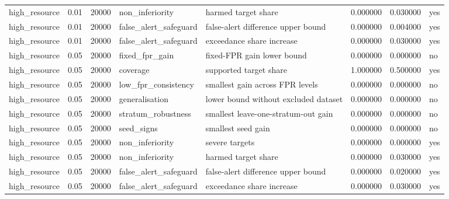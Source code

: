 \begin{tabular}{llllllll}
high\_resource & 0.01 & 20000 & non\_inferiority & harmed target share & 0.000000 & 0.030000 & yes \\
high\_resource & 0.01 & 20000 & false\_alert\_safeguard & false-alert difference upper bound & 0.000000 & 0.004000 & yes \\
high\_resource & 0.01 & 20000 & false\_alert\_safeguard & exceedance share increase & 0.000000 & 0.030000 & yes \\
high\_resource & 0.05 & 20000 & fixed\_fpr\_gain & fixed-FPR gain lower bound & 0.000000 & 0.000000 & no \\
high\_resource & 0.05 & 20000 & coverage & supported target share & 1.000000 & 0.500000 & yes \\
high\_resource & 0.05 & 20000 & low\_fpr\_consistency & smallest gain across FPR levels & 0.000000 & 0.000000 & no \\
high\_resource & 0.05 & 20000 & generalisation & lower bound without excluded dataset & 0.000000 & 0.000000 & no \\
high\_resource & 0.05 & 20000 & stratum\_robustness & smallest leave-one-stratum-out gain & 0.000000 & 0.000000 & no \\
high\_resource & 0.05 & 20000 & seed\_signs & smallest seed gain & 0.000000 & 0.000000 & no \\
high\_resource & 0.05 & 20000 & non\_inferiority & severe targets & 0.000000 & 0.000000 & yes \\
high\_resource & 0.05 & 20000 & non\_inferiority & harmed target share & 0.000000 & 0.030000 & yes \\
high\_resource & 0.05 & 20000 & false\_alert\_safeguard & false-alert difference upper bound & 0.000000 & 0.020000 & yes \\
high\_resource & 0.05 & 20000 & false\_alert\_safeguard & exceedance share increase & 0.000000 & 0.030000 & yes \\
\bottomrule
\end{tabular}
